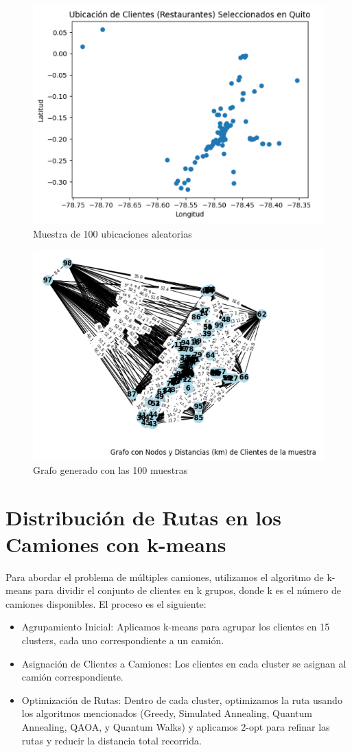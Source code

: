 \documentclass[11pt,a4paper,spanish]{book}
\begin{document}
\begin{figure}[h!]
    \centering
    \includegraphics[width=0.7\linewidth]{ubicaciones.png}
    \caption{Muestra de 100 ubicaciones aleatorias}
    \label{fig:enter-label}
\end{figure}

\begin{figure}[h!]
    \centering
    \includegraphics[width=0.6\linewidth]{grafoinicial.png}
    \caption{Grafo generado con las 100 muestras}
    \label{fig:enter-label}
\end{figure}




\section{Distribución de Rutas en los Camiones con k-means}

Para abordar el problema de múltiples camiones, utilizamos el algoritmo de k-means para dividir el conjunto de clientes en k grupos, donde k es el número de camiones disponibles. El proceso es el siguiente:
\begin{itemize}
    \item Agrupamiento Inicial: Aplicamos k-means para agrupar los clientes en 15 clusters, cada uno correspondiente a un camión.
    \item Asignación de Clientes a Camiones: Los clientes en cada cluster se asignan al camión correspondiente.
    \item Optimización de Rutas: Dentro de cada cluster, optimizamos la ruta usando los algoritmos mencionados (Greedy, Simulated Annealing, Quantum Annealing, QAOA, y Quantum Walks) y aplicamos 2-opt para refinar las rutas y reducir la distancia total recorrida.
\end{itemize}
\end{document}

